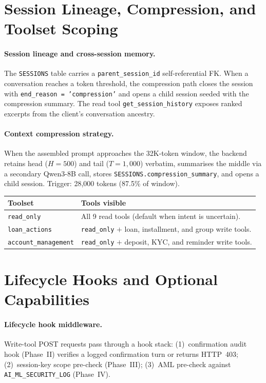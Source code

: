 \documentclass[12pt, a4paper]{report}
\newcommand{\tableheadcolor}{\rowcolor{TableHeadBg}}
\begin{document}
\section{Session Lineage, Compression, and Toolset Scoping}

\paragraph{Session lineage and cross-session memory.}
The \texttt{SESSIONS} table carries a \texttt{parent\_session\_id} self-referential FK. When a conversation reaches a token threshold, the compression path closes the session with \texttt{end\_reason = 'compression'} and opens a child session seeded with the compression summary. The read tool \texttt{get\_session\_history} exposes ranked excerpts from the client's conversation ancestry.

\paragraph{Context compression strategy.}
When the assembled prompt approaches the 32K-token window, the backend retains head ($H{=}500$) and tail ($T{=}1{,}000$) verbatim, summarises the middle via a secondary Qwen3-8B call, stores \texttt{SESSIONS.compression\_summary}, and opens a child session. Trigger: 28{,}000 tokens (87.5\% of window).

\begin{table}[H]
\centering
\begin{tabular}{p{3.5cm}p{9cm}}
\toprule
\tableheadcolor
\textbf{Toolset} & \textbf{Tools visible} \\
\midrule
\texttt{read\_only} & All 9 read tools (default when intent is uncertain). \\
\texttt{loan\_actions} & \texttt{read\_only} $+$ loan, installment, and group write tools. \\
\texttt{account\_management} & \texttt{read\_only} $+$ deposit, KYC, and reminder write tools. \\
\bottomrule
\end{tabular}
\end{table}

\section{Lifecycle Hooks and Optional Capabilities}

\paragraph{Lifecycle hook middleware.}
Write-tool POST requests pass through a hook stack: (1)~confirmation audit hook (Phase~II) verifies a logged confirmation turn or returns HTTP~403; (2)~session-key scope pre-check (Phase~III); (3)~AML pre-check against \texttt{AI\_ML\_SECURITY\_LOG} (Phase~IV).
\end{document}
